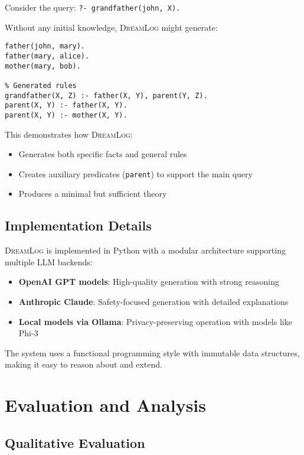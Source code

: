 \documentclass[11pt,a4paper]{article}
\newcommand{\dreamlog}{\textsc{DreamLog}}
\begin{document}
Consider the query: \texttt{?- grandfather(john, X).}

Without any initial knowledge, \dreamlog{} might generate:

\begin{lstlisting}[style=prologstyle]
% Generated facts
father(john, mary).
father(mary, alice).
mother(mary, bob).

% Generated rules  
grandfather(X, Z) :- father(X, Y), parent(Y, Z).
parent(X, Y) :- father(X, Y).
parent(X, Y) :- mother(X, Y).
\end{lstlisting}

This demonstrates how \dreamlog{}:
\begin{itemize}
\item Generates both specific facts and general rules
\item Creates auxiliary predicates (\texttt{parent}) to support the main query
\item Produces a minimal but sufficient theory
\end{itemize}

\subsection{Implementation Details}

\dreamlog{} is implemented in Python with a modular architecture supporting multiple LLM backends:
\begin{itemize}
\item \textbf{OpenAI GPT models}: High-quality generation with strong reasoning
\item \textbf{Anthropic Claude}: Safety-focused generation with detailed explanations  
\item \textbf{Local models via Ollama}: Privacy-preserving operation with models like Phi-3
\end{itemize}

The system uses a functional programming style with immutable data structures, making it easy to reason about and extend.

\section{Evaluation and Analysis}

\subsection{Qualitative Evaluation}
\end{document}
